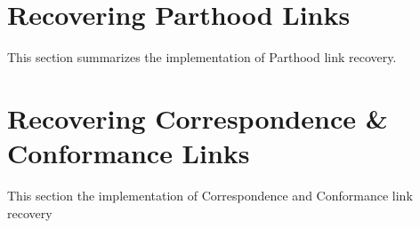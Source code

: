 \section{Recovering Parthood Links}
\label{section:RecoveryOfParthoodLinks}
This section summarizes the implementation of \gls{Parthood} link recovery.





\section{Recovering Correspondence \& Conformance Links}
\label{section:RecoveryOfCorrespondenceAndConformanceLinks}
This section the implementation of \gls{Correspondence} and \gls{Conformance} link recovery